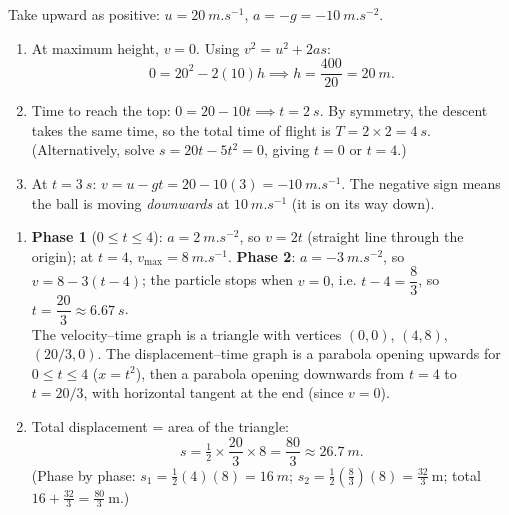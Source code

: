 \documentclass[11pt]{article}
\begin{document}
\begin{corrige}
Take upward as positive: $u = \SI{20}{m.s^{-1}}$, $a = -g = \SI{-10}{m.s^{-2}}$.
\begin{enumerate}
\item At maximum height, $v = 0$. Using $v^2 = u^2 + 2as$:
\[
0 = 20^2 - 2(10)h \implies h = \dfrac{400}{20} = \SI{20}{m}.
\]
\item Time to reach the top: $0 = 20 - 10t \implies t = \SI{2}{s}$. By symmetry, the descent takes the same time, so the total time of flight is $T = 2 \times 2 = \SI{4}{s}$. (Alternatively, solve $s = 20t - 5t^2 = 0$, giving $t = 0$ or $t = 4$.)
\item At $t = \SI{3}{s}$: $v = u - gt = 20 - 10(3) = \SI{-10}{m.s^{-1}}$. The negative sign means the ball is moving \emph{downwards} at $\SI{10}{m.s^{-1}}$ (it is on its way down).
\end{enumerate}
\end{corrige}

\begin{corrige}
\begin{enumerate}
\item \textbf{Phase 1} ($0 \le t \le 4$): $a = \SI{2}{m.s^{-2}}$, so $v = 2t$ (straight line through the origin); at $t=4$, $v_{\max} = \SI{8}{m.s^{-1}}$. \textbf{Phase 2}: $a = \SI{-3}{m.s^{-2}}$, so $v = 8 - 3(t-4)$; the particle stops when $v=0$, i.e. $t - 4 = \dfrac{8}{3}$, so $t = \dfrac{20}{3} \approx \SI{6.67}{s}$.\\
The velocity–time graph is a triangle with vertices $(0,0)$, $(4,8)$, $(20/3, 0)$. The displacement–time graph is a parabola opening upwards for $0\le t\le 4$ ($x = t^2$), then a parabola opening downwards from $t=4$ to $t = 20/3$, with horizontal tangent at the end (since $v=0$).
\begin{center}
\end{center}
\item Total displacement = area of the triangle:
\[
s = \tfrac12 \times \dfrac{20}{3} \times 8 = \dfrac{80}{3} \approx \SI{26.7}{m}.
\]
(Phase by phase: $s_1 = \tfrac12(4)(8) = \SI{16}{m}$; $s_2 = \tfrac12\left(\tfrac83\right)(8) = \tfrac{32}{3}\ \mathrm{m}$; total $16 + \tfrac{32}{3} = \tfrac{80}{3}\ \mathrm{m}$.)
\end{enumerate}
\end{corrige}
\end{document}

